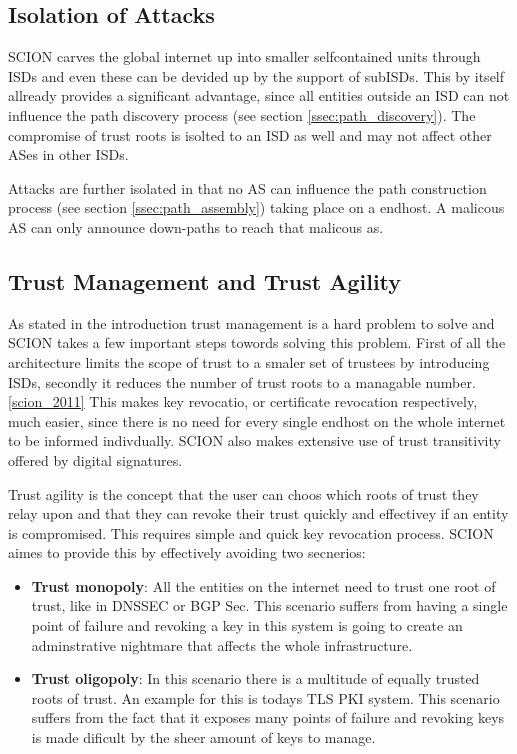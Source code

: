\documentclass[../eva1_scion.tex]{subfiles}
\begin{document}
    \subsection{Isolation of Attacks}
    SCION carves the global internet up into smaller selfcontained units through ISDs and even these can be devided up by the support of subISDs. This by itself allready provides a significant advantage, since all entities outside an ISD can not influence the path discovery process (see section \ref{ssec:path_discovery}). The compromise of trust roots is isolted to an ISD as well and may not affect other ASes in other ISDs.

    Attacks are further isolated in that no AS can influence the path construction process (see section \ref{ssec:path_assembly}) taking place on a endhost. A malicous AS can only announce down-paths to reach that malicous as. 

    \subsection{Trust Management and Trust Agility}
    As stated in the introduction trust management is a hard problem to solve and SCION takes a few important steps towords solving this problem. First of all the architecture limits the scope of trust to a smaler set of trustees by introducing ISDs, secondly it reduces the number of trust roots to a managable number. \ref{scion_2011} This makes key revocatio, or certificate revocation respectively, much easier, since there is no need for every single endhost on the whole internet to be informed indivdually. SCION also makes extensive use of trust transitivity offered by digital signatures.

    Trust agility is the concept that the user can choos which roots of trust they relay upon and that they can revoke their trust quickly and effectivey if an entity is compromised. This requires simple and quick key revocation process. SCION aimes to provide this by effectively avoiding two secnerios:

    \begin{itemize}
        \item \textbf{Trust monopoly}: All the entities on the internet need to trust one root of trust, like in DNSSEC or BGP Sec. This scenario suffers from having a single point of failure and revoking a key in this system is going to create an adminstrative nightmare that affects the whole infrastructure.
        \item  \textbf{Trust oligopoly}: In this scenario there is a multitude of equally trusted roots of trust. An example for this is todays TLS PKI system. This scenario suffers from the fact that it exposes many points of failure and revoking keys is made dificult by the sheer amount of keys to manage.
    \end{itemize}
\end{document}
